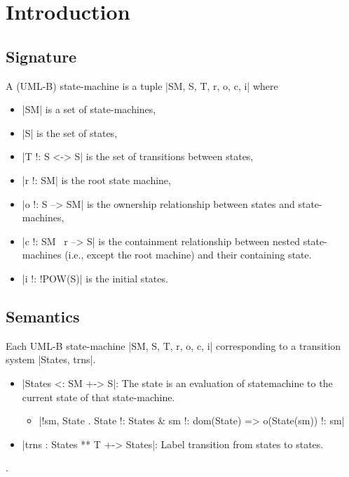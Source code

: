 
\section{Introduction}
\label{sec:introduction}

\subsection{Signature}
A (UML-B) state-machine is a tuple |SM, S, T, r, o, c, i| where
\begin{itemize}
\item |SM| is a set of state-machines,

\item |S| is the set of states,

\item |T !: S <-> S| is the set of transitions between states,

\item |r !: SM| is the root state machine,

\item |o !: S --> SM| is the ownership relationship between states and state-machines,

\item |c !: SM \ {r} --> S| is the containment relationship between nested state-machines (i.e., except the root machine) and their containing state.

\item |i !: !POW(S)| is the initial states.
\end{itemize}

\subsection{Semantics}
Each UML-B state-machine |SM, S, T, r, o, c, i| corresponding to a transition system |States, trns|.
\begin{itemize}
\item |States <: SM +-> S|: The state is an evaluation of statemachine to the current state of that state-machine.
  \begin{itemize}
  \item |!sm, State . State !: States & sm !: dom(State) => o(State(sm)) !: sm| 
  \end{itemize}

\item |trns : States ** T +-> States|: Label transition from states to states.
\end{itemize}
.

